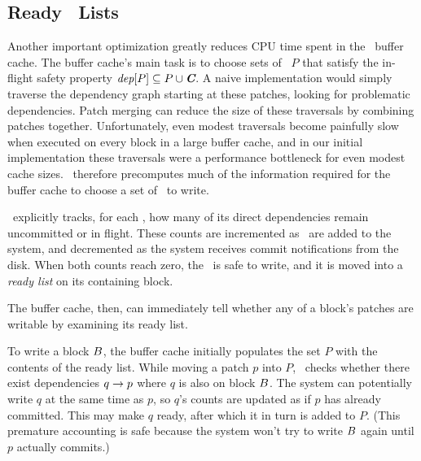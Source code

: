 
\subsection{Ready \Patch\ Lists}
\label{sec:patch:readylist}

\newcommand{\PReady}[1]{\ensuremath{#1.\textit{ready}}}

Another important optimization greatly reduces CPU time spent in the
\Kudos\ buffer cache.
%
The buffer cache's main task is to choose sets of \patches\ $P$ that
satisfy the in-flight safety property $\PDepset{P} \subseteq P \cup
\PDisk$.
%
A naive implementation would simply traverse the dependency graph starting
at these patches, looking for problematic dependencies.
%
Patch merging can reduce the size of these traversals by combining patches
together.
%
Unfortunately, even modest traversals become painfully slow when executed
on every block in a large buffer cache, and in our initial implementation
these traversals were a performance bottleneck for even modest cache
sizes.
% 
\Featherstitch\ therefore precomputes much of the information
required for the buffer cache to choose a set of \patches\ to write.

\Kudos\ explicitly tracks, for each \patch, how many of its
direct dependencies remain uncommitted or in flight.
%
These counts are incremented as \patches\ are added to the system, and
decremented as the system receives commit notifications from the disk.
%
When both counts reach zero, the \patch\ is safe to write, and it is moved
into a \emph{ready list} on its containing block.
%
\begin{comment}
(\Noop\ \patches\ automatically commit when all their dependencies commit.)
\end{comment}
%
The buffer cache, then, can immediately tell whether any of a block's
patches are writable by examining its ready list.

To write a block $B$, the buffer cache initially populates the set $P$ with the
contents of the ready list.
%
While moving a patch $p$ into $P$, \Kudos\ checks whether there exist
dependencies $q \rightarrow p$ where $q$ is also on block $B$.
%
The system can potentially write $q$ at the same time as $p$, so $q$'s
counts are updated as if $p$ has already committed.
%
This may make $q$ ready, after which it in turn is added to $P$.
%
(This premature accounting is safe because the system won't try to write
$B$ again until $p$ actually commits.)


